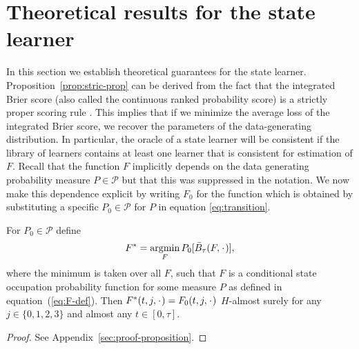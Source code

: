 \documentclass[a4,danish]{article}
\begin{document}
\section{Theoretical results for the state learner}
\label{sec:theor-results-prop}

In this section we establish theoretical guarantees for the state learner.
Proposition~\ref{prop:stric-prop} can be derived from the fact that the
integrated Brier score (also called the continuous ranked probability score) is
a strictly proper scoring rule \citep{gneiting2007strictly}. This implies that
if we minimize the average loss of the integrated Brier score, we recover the
parameters of the data-generating distribution. In particular, the oracle of a
state learner will be consistent if the library of learners contains at least
one learner that is consistent for estimation of \( F \). Recall that the
function \(F\) implicitly depends on the data generating probability measure
\(P\in\mathcal P\) but that this was suppressed in the notation. We now make
this dependence explicit by writing \(F_0\) for the function which is obtained
by substituting a specific \(P_0\in\mathcal{P}\) for \(P\) in equation
\eqref{eq:transition}.

\begin{proposition}
  \label{prop:stric-prop}
  For \(P_0\in\mathcal{P}\) define
  \begin{equation*}
    F^* = \argmin_{F} P_0{[\bar{B}_\tau(F, \blank)]},
\end{equation*}
where the minimum is taken over all \( F \), such that \( F \) is a conditional
state occupation probability function for some measure \( P \) as defined in equation~(\ref{eq:F-def}).
Then \( F^*(t,j,\blank) = F_0(t,j,\blank) \) \( H \)-almost surely for
any \( j\in \{0,1,2,3\} \) and almost any \( t \in [0, \tau]\).
\end{proposition}
\begin{proof}
  See Appendix~\ref{sec:proof-proposition}.
\end{proof}
\end{document}
